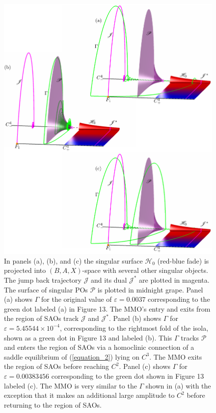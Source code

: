\documentclass{ws-ijbc}
\begin{document}
\begin{figure}[H]
\centering
\includegraphics[]{./figures/MKMO_14.pdf}
\caption{In panels (a), (b), and (c) the singular surface $\mathscr{H}_0$ (red-blue fade) is projected into $(B,A,X)$-space with several other singular objects.  The jump back trajectory $\mathscr{J}$ and its dual $\mathscr{J}^*$ are plotted in magenta.  The surface of singular POs $\mathscr{P}$ is plotted in midnight grape.  Panel (a) shows $\Gamma$ for the original value of $\varepsilon=0.0037$ corresponding to the green dot labeled (a) in Figure 13.  The MMO's entry and exits from the region of SAOs track $\mathscr{J}$ and $\mathscr{J}^*$.  Panel (b) shows $\Gamma$ for $\varepsilon=5.45544 \times 10^{-4}$, corresponding to the rightmost fold of the isola, shown as a green dot in Figure 13 and labeled (b).  This $\Gamma$ tracks $\mathscr{P}$ and enters the region of SAOs via a homoclinic connection of a saddle equilibrium of (\ref{equation_2}) lying on $C^3$.  The MMO exits the region of SAOs before reaching $C^2$.  Panel (c) shows $\Gamma$ for $\varepsilon=0.00383456$ corresponding to the green dot shown in Figure 13 labeled (c).  The MMO is very similar to the $\Gamma$ shown in (a) with the exception that it makes an additional large amplitude to $C^2$ before returning to the region of SAOs.}

\label{heteroclinic}
\end{figure}
\end{document}
